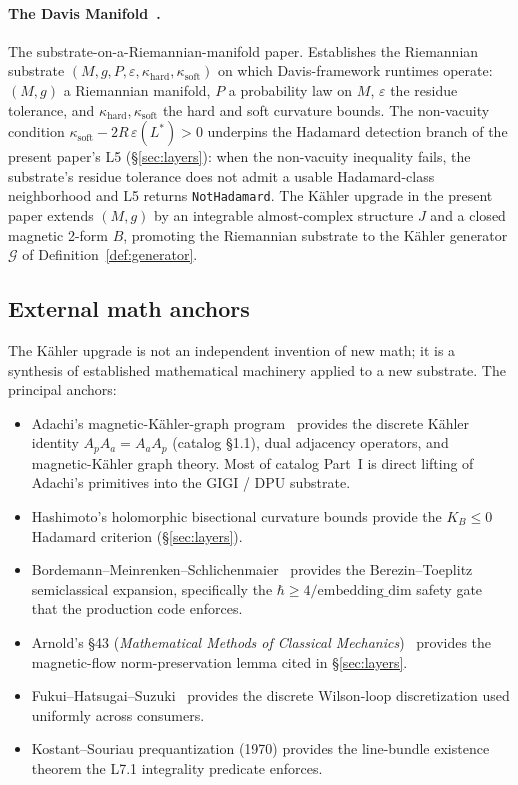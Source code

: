 \documentclass[11pt,letterpaper]{article}
\begin{document}
\paragraph{The Davis Manifold~\cite{davis2026manifold}.}
The substrate-on-a-Riemannian-manifold paper. Establishes the
Riemannian substrate
$(M, g, P, \varepsilon, \kappa_{\text{hard}}, \kappa_{\text{soft}})$
on which Davis-framework runtimes operate: $(M, g)$ a Riemannian
manifold, $P$ a probability law on $M$, $\varepsilon$ the residue
tolerance, and $\kappa_{\text{hard}}, \kappa_{\text{soft}}$ the
hard and soft curvature bounds. The non-vacuity condition
$\kappa_{\text{soft}} - 2 R\,\varepsilon(L^*) > 0$ underpins the
Hadamard detection branch of the present paper's L5
(\S\ref{sec:layers}): when the non-vacuity inequality fails, the
substrate's residue tolerance does not admit a usable
Hadamard-class neighborhood and L5 returns
\texttt{NotHadamard}. The K\"ahler upgrade in the present paper
extends $(M, g)$ by an integrable almost-complex structure $J$ and
a closed magnetic 2-form $B$, promoting the Riemannian substrate to
the K\"ahler generator $\mathcal{G}$ of Definition~\ref{def:generator}.

\subsection{External math anchors}

The K\"ahler upgrade is not an independent invention of new math; it
is a synthesis of established mathematical machinery applied to a new
substrate. The principal anchors:

\begin{itemize}[nosep]
\item Adachi's magnetic-K\"ahler-graph
  program~\cite{adachi2010hopfrinow} provides the discrete K\"ahler
  identity $A_p A_a = A_a A_p$ (catalog \S1.1), dual adjacency
  operators, and magnetic-K\"ahler graph theory. Most of catalog
  Part~I is direct lifting of Adachi's primitives into the GIGI / DPU
  substrate.
\item Hashimoto's holomorphic bisectional curvature bounds provide
  the $K_B \leq 0$ Hadamard criterion (\S\ref{sec:layers}).
\item Bordemann--Meinrenken--Schlichenmaier~\cite{bordemann1994toeplitz}
  provides the Berezin--Toeplitz semiclassical expansion,
  specifically the $\hbar \geq 4/\text{embedding\_dim}$ safety gate
  that the production code enforces.
\item Arnold's \S43 (\emph{Mathematical Methods of Classical
  Mechanics})~\cite{arnold1989mechanics} provides the magnetic-flow
  norm-preservation lemma cited in \S\ref{sec:layers}.
\item Fukui--Hatsugai--Suzuki~\cite{fhs2005chern} provides the
  discrete Wilson-loop discretization used uniformly across
  consumers.
\item Kostant--Souriau prequantization (1970) provides the
  line-bundle existence theorem the L7.1 integrality predicate
  enforces.
\end{itemize}
\end{document}
